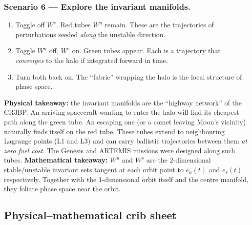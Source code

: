 \documentclass[11pt,a4paper]{article}
\begin{document}
\subsubsection*{Scenario 6 --- Explore the invariant manifolds.}
\begin{enumerate}[leftmargin=*]
  \item Toggle off $W^s$. Red tubes $W^u$ remain. These are the trajectories of perturbations seeded \emph{along} the unstable direction.
  \item Toggle $W^u$ off, $W^s$ on. Green tubes appear. Each is a trajectory that \emph{converges} to the halo if integrated forward in time.
  \item Turn both back on. The ``fabric'' wrapping the halo is the local structure of phase space.
\end{enumerate}
\textbf{Physical takeaway:} the invariant manifolds are the ``highway network'' of the CR3BP. An arriving spacecraft wanting to enter the halo will find its cheapest path along the green tube. An escaping one (or a comet leaving Moon's vicinity) naturally finds itself on the red tube. These tubes extend to neighbouring Lagrange points (L1 and L3) and can carry ballistic trajectories between them \emph{at zero fuel cost}. The Genesis and ARTEMIS missions were designed along such tubes.
\textbf{Mathematical takeaway:} $W^u$ and $W^s$ are the 2-dimensional stable/unstable invariant sets tangent at each orbit point to $e_u(t)$ and $e_s(t)$ respectively. Together with the 1-dimensional orbit itself and the centre manifold, they foliate phase space near the orbit.

\subsection{Physical--mathematical crib sheet}\label{sec:demo:crib}
\end{document}
